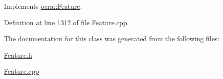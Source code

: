 Implements \hyperlink{classocra_1_1Feature_ad16d6b176b229280649ab405531e9a30}{ocra\+::\+Feature}.



Definition at line 1312 of file Feature.\+cpp.



The documentation for this class was generated from the following files\+:\begin{DoxyCompactItemize}
\item 
\hyperlink{Feature_8h}{Feature.\+h}\item 
\hyperlink{Feature_8cpp}{Feature.\+cpp}\end{DoxyCompactItemize}
